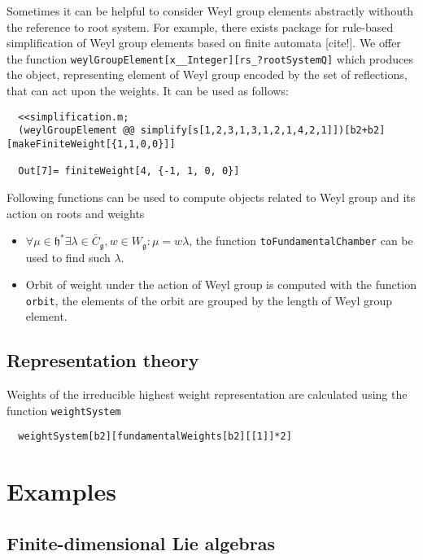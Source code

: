 \documentclass[12pt]{article}
\theoremstyle{definition}
\newcommand{\gf}{\mathfrak{g}}
\newcommand{\hf}{\mathfrak{h}}
\begin{document}
Sometimes it can be helpful to consider Weyl group elements abstractly withouth the reference to root system. For example, there exists package for rule-based simplification of Weyl group elements based on finite automata [cite!]. We offer the function \lstinline{weylGroupElement[x__Integer][rs_?rootSystemQ]} which produces the object, representing element of Weyl group encoded by the set of reflections, that can act upon the weights. It can be used as follows:
\begin{lstlisting}
  <<simplification.m;
  (weylGroupElement @@ simplify[s[1,2,3,1,3,1,2,1,4,2,1]])[b2+b2][makeFiniteWeight[{1,1,0,0}]]

  Out[7]= finiteWeight[4, {-1, 1, 0, 0}]
\end{lstlisting}


Following functions can be used to compute objects related to Weyl group and its action on roots and weights
 \begin{itemize}
 \item   $\forall \mu\in \hf^* \exists \lambda\in \bar C_{\gf}, w\in W_{\gf}: \mu=w \lambda$, the function \lstinline{toFundamentalChamber} can be used to find such $\lambda$.
 \item Orbit of weight under the action of Weyl group is computed with the function \lstinline{orbit}, the elements of the orbit are grouped by the length of Weyl group element.
 \end{itemize}

\subsection{Representation theory}
\label{sec:repr-theory}

Weights of the irreducible highest weight representation are calculated using the function \lstinline{weightSystem}
\begin{lstlisting}
  weightSystem[b2][fundamentalWeights[b2][[1]]*2]
\end{lstlisting}


\section{Examples}
\label{sec:examples}

\subsection{Finite-dimensional Lie algebras}
\label{sec:finite-dimens-lie}
\end{document}
